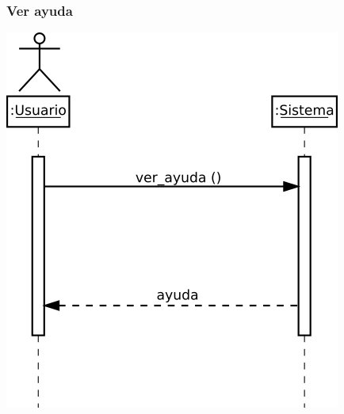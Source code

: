\subsubsection{Ver ayuda}
\begin{center}
\includegraphics[scale=0.4]{ver_ayuda.png} \\
\end{center}

